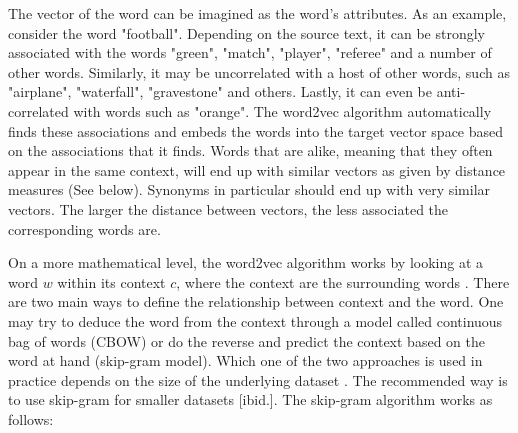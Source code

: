 \documentclass[10pt, a4paper]{UUThesisTemplate}
\begin{document}
The vector of the word can be imagined as the word's attributes. As an example, consider the word "football". Depending on the source text, it can be strongly associated with the words "green", "match", "player", "referee" and a number of other words. Similarly, it may be uncorrelated with a host of other words, such as "airplane", "waterfall", "gravestone" and others. Lastly, it can even be anti-correlated with words such as "orange". The word2vec algorithm automatically finds these associations and embeds the words into the target vector space based on the associations that it finds. Words that are alike, meaning that they often appear in the same context, will end up with similar vectors as given by distance measures (See below). Synonyms in particular should end up with very similar vectors. The larger the distance between vectors, the less associated the corresponding words are.

On a more mathematical level, the word2vec algorithm works by looking at a word $w$ within its context $c$, where the context are the surrounding words \cite{skipgram,word2vecexplained}. There are two main ways to define the relationship between context and the word. One may try to deduce the word from the context through a model called continuous bag of words (CBOW) or do the reverse and predict the context based on the word at hand (skip-gram model). Which one of the two approaches is used in practice depends on the size of the underlying dataset \cite{skipgramcbow}. The recommended way is to use skip-gram for smaller datasets [ibid.]. The skip-gram algorithm works as follows:
\end{document}
